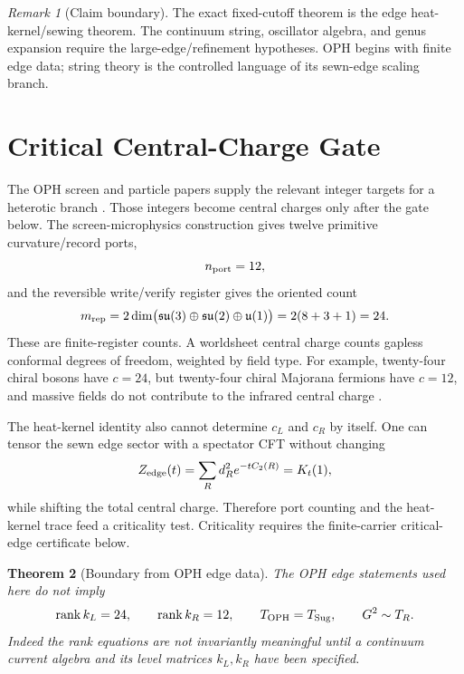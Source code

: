 \documentclass[11pt]{article}
\newtheorem{theorem}{Theorem}[section]
\theoremstyle{remark}
\newtheorem{remark}[theorem]{Remark}
\theoremstyle{plain}
\newcommand{\OPH}{\mathrm{OPH}}
\begin{document}
\begin{remark}[Claim boundary]
The exact fixed-cutoff theorem is the edge heat-kernel/sewing theorem. The continuum string,
oscillator algebra, and genus expansion require the large-edge/refinement hypotheses. OPH begins
with finite edge data; string theory is the controlled language of its sewn-edge scaling branch.
\end{remark}

\section{Critical Central-Charge Gate}\label{sec:central-charge-gate}

The OPH screen and particle papers supply the relevant integer targets for a heterotic branch
\cite{OPHScreenMicrophysics,OPHParticleZoo}. Those integers become central charges only after the
gate below. The screen-microphysics construction gives twelve primitive
curvature/record ports,
\[
n_{\rm port}=12,
\]
and the reversible write/verify register gives the oriented count
\[
m_{\rm rep}
=2\dim\bigl(\mathfrak{su}(3)\oplus\mathfrak{su}(2)\oplus\mathfrak u(1)\bigr)
=2(8+3+1)=24.
\]
These are finite-register counts. A worldsheet central charge counts gapless conformal degrees of
freedom, weighted by field type. For example, twenty-four chiral bosons have \(c=24\), but
twenty-four chiral Majorana fermions have \(c=12\), and massive fields do not contribute to the
infrared central charge \cite{PolchinskiStringVol1,DiFrancescoCFT}.

The heat-kernel identity also cannot determine \(c_L\) and \(c_R\) by itself. One can tensor the
sewn edge sector with a spectator CFT without changing
\[
Z_{\rm edge}(t)=\sum_R d_R^2e^{-tC_2(R)}=K_t(1),
\]
while shifting the total central charge. Therefore port counting and the heat-kernel trace feed a
criticality test. Criticality requires the finite-carrier critical-edge certificate below.

\begin{theorem}[Boundary from OPH edge data]
The OPH edge statements used here do not imply
\[
\operatorname{rank}k_L=24,\qquad
\operatorname{rank}k_R=12,\qquad
T_{\OPH}=T_{\rm Sug},\qquad
G^2\sim T_R.
\]
Indeed the rank equations are not invariantly meaningful until a continuum current algebra and its
level matrices \(k_L,k_R\) have been specified.
\end{theorem}
\end{document}
